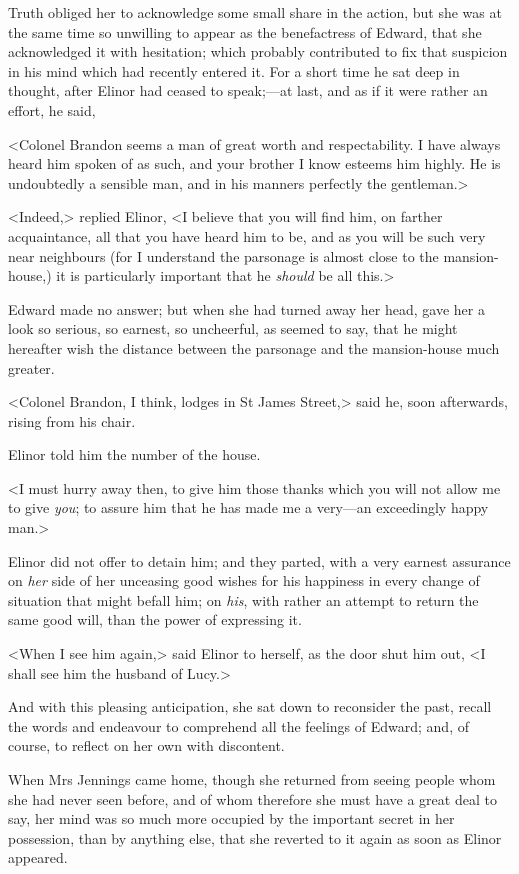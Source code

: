 Truth obliged her to acknowledge some small share in the action, but she was at the same time so unwilling to appear as the benefactress of Edward, that she acknowledged it with hesitation; which probably contributed to fix that suspicion in his mind which had recently entered it. For a short time he sat deep in thought, after Elinor had ceased to speak;—at last, and as if it were rather an effort, he said,

<Colonel Brandon seems a man of great worth and respectability. I have always heard him spoken of as such, and your brother I know esteems him highly. He is undoubtedly a sensible man, and in his manners perfectly the gentleman.>

<Indeed,> replied Elinor, <I believe that you will find him, on farther acquaintance, all that you have heard him to be, and as you will be such very near neighbours (for I understand the parsonage is almost close to the mansion-house,) it is particularly important that he \textit{should} be all this.>

Edward made no answer; but when she had turned away her head, gave her a look so serious, so earnest, so uncheerful, as seemed to say, that he might hereafter wish the distance between the parsonage and the mansion-house much greater.

<Colonel Brandon, I think, lodges in St James Street,> said he, soon afterwards, rising from his chair.

Elinor told him the number of the house.

<I must hurry away then, to give him those thanks which you will not allow me to give \textit{you}; to assure him that he has made me a very—an exceedingly happy man.>

Elinor did not offer to detain him; and they parted, with a very earnest assurance on \textit{her} side of her unceasing good wishes for his happiness in every change of situation that might befall him; on \textit{his}, with rather an attempt to return the same good will, than the power of expressing it.

<When I see him again,> said Elinor to herself, as the door shut him out, <I shall see him the husband of Lucy.>

And with this pleasing anticipation, she sat down to reconsider the past, recall the words and endeavour to comprehend all the feelings of Edward; and, of course, to reflect on her own with discontent.

When Mrs Jennings came home, though she returned from seeing people whom she had never seen before, and of whom therefore she must have a great deal to say, her mind was so much more occupied by the important secret in her possession, than by anything else, that she reverted to it again as soon as Elinor appeared.

